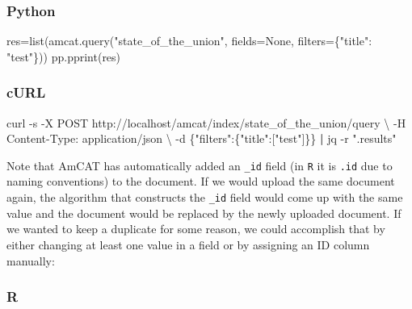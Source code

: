 \documentclass[
  letterpaper,
  DIV=11,
  numbers=noendperiod]{scrreprt}
\newenvironment{Shaded}{\begin{snugshade}}{\end{snugshade}}
\newcommand{\AttributeTok}[1]{\textcolor[rgb]{0.40,0.45,0.13}{#1}}
\newcommand{\BuiltInTok}[1]{\textcolor[rgb]{0.00,0.23,0.31}{#1}}
\newcommand{\DataTypeTok}[1]{\textcolor[rgb]{0.68,0.00,0.00}{#1}}
\newcommand{\ExtensionTok}[1]{\textcolor[rgb]{0.00,0.23,0.31}{#1}}
\newcommand{\KeywordTok}[1]{\textcolor[rgb]{0.00,0.23,0.31}{\textbf{#1}}}
\newcommand{\NormalTok}[1]{\textcolor[rgb]{0.00,0.23,0.31}{#1}}
\newcommand{\OperatorTok}[1]{\textcolor[rgb]{0.37,0.37,0.37}{#1}}
\newcommand{\StringTok}[1]{\textcolor[rgb]{0.13,0.47,0.30}{#1}}
\newcommand{\VariableTok}[1]{\textcolor[rgb]{0.07,0.07,0.07}{#1}}
\begin{document}
\subsubsection{Python}

\begin{Shaded}
\begin{Highlighting}[]
\NormalTok{res}\OperatorTok{=}\BuiltInTok{list}\NormalTok{(amcat.query(}\StringTok{"state\_of\_the\_union"}\NormalTok{, fields}\OperatorTok{=}\VariableTok{None}\NormalTok{, filters}\OperatorTok{=}\NormalTok{\{}\StringTok{"title"}\NormalTok{: }\StringTok{"test"}\NormalTok{\}))}
\NormalTok{pp.pprint(res)}
\end{Highlighting}
\end{Shaded}

\subsubsection{cURL}

\begin{Shaded}
\begin{Highlighting}[]
\ExtensionTok{curl} \AttributeTok{{-}s} \AttributeTok{{-}X}\NormalTok{ POST http://localhost/amcat/index/state\_of\_the\_union/query }\DataTypeTok{\textbackslash{}}
  \AttributeTok{{-}H} \StringTok{\textquotesingle{}Content{-}Type: application/json\textquotesingle{}} \DataTypeTok{\textbackslash{}}
  \AttributeTok{{-}d} \StringTok{\textquotesingle{}\{"filters":\{"title":["test"]\}\}\textquotesingle{}} \KeywordTok{|} \ExtensionTok{jq} \AttributeTok{{-}r} \StringTok{".results"}
\end{Highlighting}
\end{Shaded}

Note that AmCAT has automatically added an \texttt{\_id} field (in
\texttt{R} it is \texttt{.id} due to naming conventions) to the
document. If we would upload the same document again, the algorithm that
constructs the \texttt{\_id} field would come up with the same value and
the document would be replaced by the newly uploaded document. If we
wanted to keep a duplicate for some reason, we could accomplish that by
either changing at least one value in a field or by assigning an ID
column manually:

\subsubsection{R}
\end{document}
